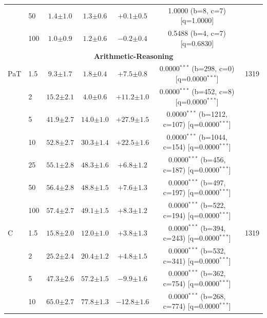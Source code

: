 \begin{table}[h!]
\begin{tabular}{l l cccc c}
 & 50 & $1.4 {\scriptstyle \pm 1.0}$ & $1.3 {\scriptstyle \pm 0.6}$ & $+0.1 {\scriptstyle \pm 0.5}$ & 1.0000 (b=8, c=7) [q=1.0000] &  \\
 & 100 & $1.0 {\scriptstyle \pm 0.9}$ & $1.2 {\scriptstyle \pm 0.6}$ & $-0.2 {\scriptstyle \pm 0.4}$ & 0.5488 (b=4, c=7) [q=0.6830] &  \\
\midrule
\multicolumn{7}{c}{\textbf{Arithmetic-Reasoning}} \\
\midrule
PaT & 1.5 & $9.3 {\scriptstyle \pm 1.7}$ & $1.8 {\scriptstyle \pm 0.4}$ & $+7.5 {\scriptstyle \pm 0.8}$ & 0.0000$^{***}$ (b=298, c=0) [q=0.0000$^{***}$] & 1319 \\
 & 2 & $15.2 {\scriptstyle \pm 2.1}$ & $4.0 {\scriptstyle \pm 0.6}$ & $+11.2 {\scriptstyle \pm 1.0}$ & 0.0000$^{***}$ (b=452, c=8) [q=0.0000$^{***}$] &  \\
 & 5 & $41.9 {\scriptstyle \pm 2.7}$ & $14.0 {\scriptstyle \pm 1.0}$ & $+27.9 {\scriptstyle \pm 1.5}$ & 0.0000$^{***}$ (b=1212, c=107) [q=0.0000$^{***}$] &  \\
 & 10 & $52.8 {\scriptstyle \pm 2.7}$ & $30.3 {\scriptstyle \pm 1.4}$ & $+22.5 {\scriptstyle \pm 1.6}$ & 0.0000$^{***}$ (b=1044, c=154) [q=0.0000$^{***}$] &  \\
 & 25 & $55.1 {\scriptstyle \pm 2.8}$ & $48.3 {\scriptstyle \pm 1.6}$ & $+6.8 {\scriptstyle \pm 1.2}$ & 0.0000$^{***}$ (b=456, c=187) [q=0.0000$^{***}$] &  \\
 & 50 & $56.4 {\scriptstyle \pm 2.8}$ & $48.8 {\scriptstyle \pm 1.5}$ & $+7.6 {\scriptstyle \pm 1.3}$ & 0.0000$^{***}$ (b=497, c=197) [q=0.0000$^{***}$] &  \\
 & 100 & $57.4 {\scriptstyle \pm 2.7}$ & $49.1 {\scriptstyle \pm 1.5}$ & $+8.3 {\scriptstyle \pm 1.2}$ & 0.0000$^{***}$ (b=522, c=194) [q=0.0000$^{***}$] &  \\
\midrule
C & 1.5 & $15.8 {\scriptstyle \pm 2.0}$ & $12.0 {\scriptstyle \pm 1.0}$ & $+3.8 {\scriptstyle \pm 1.3}$ & 0.0000$^{***}$ (b=394, c=243) [q=0.0000$^{***}$] & 1319 \\
 & 2 & $25.2 {\scriptstyle \pm 2.4}$ & $20.4 {\scriptstyle \pm 1.2}$ & $+4.8 {\scriptstyle \pm 1.5}$ & 0.0000$^{***}$ (b=532, c=341) [q=0.0000$^{***}$] &  \\
 & 5 & $47.3 {\scriptstyle \pm 2.6}$ & $57.2 {\scriptstyle \pm 1.5}$ & $-9.9 {\scriptstyle \pm 1.6}$ & 0.0000$^{***}$ (b=362, c=754) [q=0.0000$^{***}$] &  \\
 & 10 & $65.0 {\scriptstyle \pm 2.7}$ & $77.8 {\scriptstyle \pm 1.3}$ & $-12.8 {\scriptstyle \pm 1.6}$ & 0.0000$^{***}$ (b=268, c=774) [q=0.0000$^{***}$] &  \\

\end{tabular}
\end{table}
